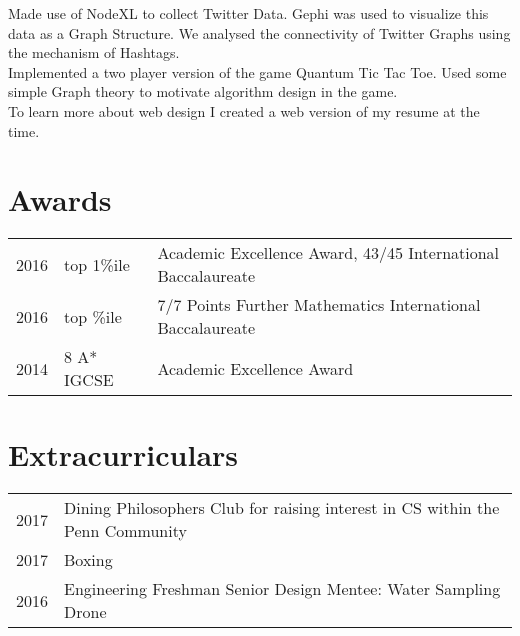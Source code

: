 \documentclass[]{deedy-resume-openfont}
\begin{document}
\begin{minipage}[t]{0.66\textwidth}
Made use of NodeXL to collect Twitter Data. Gephi was used to visualize this data as a Graph Structure. We analysed the connectivity of Twitter Graphs using the mechanism of Hashtags.
\sectionsep
\\

Implemented a two player version of the game Quantum Tic Tac Toe. Used some simple Graph theory to motivate algorithm design in the game.
\sectionsep
\\

To learn more about web design I created a web version of my resume at the time.

\sectionsep


\section{Awards}
\begin{tabular}{rll}
2016	     & top 1\%ile  & Academic Excellence Award, 43/45 International Baccalaureate\\
2016	     & top \%ile  & 7/7 Points Further Mathematics International Baccalaureate\\
2014         & 8 A* IGCSE & Academic Excellence Award
\end{tabular}
\sectionsep


\section{Extracurriculars}

\begin{tabular}{rl}
2017 	& Dining Philosophers Club for raising interest in CS within the Penn Community  \\
2017   & Boxing \\
2016 & Engineering Freshman Senior Design Mentee: Water Sampling Drone

\end{tabular}
\sectionsep

\end{minipage}
\end{document}

